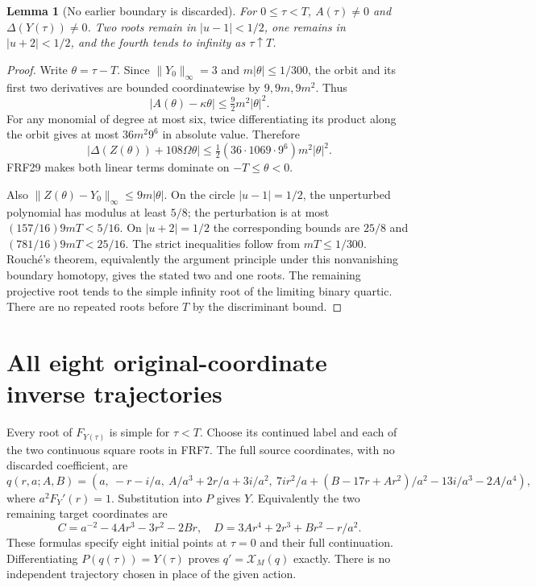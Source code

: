 \documentclass[11pt]{article}
\newtheorem{lemma}[theorem]{Lemma}
\begin{document}
\begin{lemma}[No earlier boundary is discarded]\label{lem:guard}
For $0\le\tau<T$, $A(\tau)\ne0$ and $\Delta(Y(\tau))\ne0$.
Two roots remain in $|u-1|<1/2$, one remains in $|u+2|<1/2$, and the
fourth tends to infinity as $\tau\uparrow T$.
\end{lemma}
\begin{proof}
Write $\theta=\tau-T$. Since $\|Y_0\|_\infty=3$ and
$m|\theta|\le1/300$, the orbit and its first two derivatives are bounded
coordinatewise by $9,9m,9m^2$. Thus
\[
 |A(\theta)-\kappa\theta|\le\tfrac92m^2|\theta|^2.
\]
For any monomial of degree at most six, twice differentiating its product
along the orbit gives at most $36m^2 9^6$ in absolute value. Therefore
\[
 \left|\Delta(Z(\theta))+108\Omega\theta\right|
 \le\tfrac12(36\cdot1069\cdot9^6)m^2|\theta|^2.
\]
FRF29 makes both linear terms dominate on $-T\le\theta<0$.

Also $\|Z(\theta)-Y_0\|_\infty\le9m|\theta|$. On the circle
$|u-1|=1/2$, the unperturbed polynomial has modulus at least $5/8$;
the perturbation is at most $(157/16)9mT<5/16$.
On $|u+2|=1/2$ the corresponding bounds are $25/8$ and
$(781/16)9mT<25/16$. The strict inequalities follow from
$mT\le1/300$. Rouch\'e's theorem, equivalently the argument principle
under this nonvanishing boundary homotopy, gives the stated two and one
roots. The remaining projective root tends to the simple infinity root
of the limiting binary quartic. There are no repeated roots before $T$
by the discriminant bound.
\end{proof}

\section{All eight original-coordinate inverse trajectories}
Every root of $F_{Y(\tau)}$ is simple for $\tau<T$. Choose its continued
label and each of the two continuous square roots in FRF7. The full source
coordinates, with no discarded coefficient, are
\[
 \boxed{q(r,a;A,B)=\left(
 a,\ -r-i/a,\ A/a^3+2r/a+3i/a^2,\
 7ir^2/a+(B-17r+Ar^2)/a^2-13i/a^3-2A/a^4
 \right),}\tag{FRF31}
\]
where $a^2F_Y'(r)=1$. Substitution into $P$ gives $Y$.
Equivalently the two remaining target coordinates are
\[
 C=a^{-2}-4Ar^3-3r^2-2Br,\quad
 D=3Ar^4+2r^3+Br^2-r/a^2.\tag{FRF32}
\]
These formulas specify eight initial points at $\tau=0$ and their full
continuation. Differentiating $P(q(\tau))=Y(\tau)$ proves
$q'=\mathcal X_M(q)$ exactly. There is no independent trajectory chosen
in place of the given action.
\end{document}
